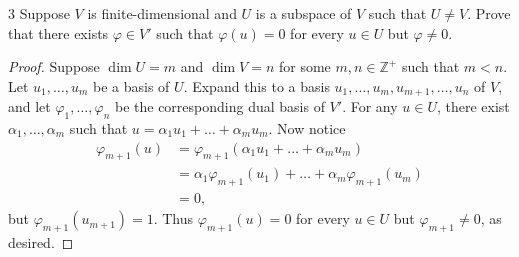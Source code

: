 \documentclass[11pt]{extarticle}
\newenvironment{problem}[1]{\begin{prob*}{#1}{}}{\end{prob*}}
\newcommand{\Z}{\mathbb{Z}}
\begin{document}
\begin{problem}{3}
Suppose $V$ is finite-dimensional and $U$ is a subspace of $V$ such that $U\neq V$.  Prove that there exists $\varphi\in V'$ such that $\varphi(u)=0$ for every $u\in U$ but $\varphi\neq 0$.
\end{problem}
\begin{proof}
Suppose $\dim U = m$ and $\dim V = n$ for some $m,n\in\Z^+$ such that $m < n$.  Let $u_1,\dots,u_m$ be a basis of $U$.  Expand this to a basis $u_1,\dots, u_m,u_{m+1},\dots,u_n$ of $V$, and let $\varphi_1,\dots,\varphi_n$ be the corresponding dual basis of $V'$.  For any $u\in U$, there exist $\alpha_1,\dots,\alpha_m$ such that $u=\alpha_1u_1+\dots+\alpha_mu_m$.  Now notice
\begin{align*}
\varphi_{m+1}(u) &= \varphi_{m+1}(\alpha_1u_1+\dots+\alpha_mu_m)\\
&= \alpha_1\varphi_{m+1}(u_1) + \dots + \alpha_m\varphi_{m+1}(u_m)\\
&= 0,
\end{align*}
but $\varphi_{m+1}(u_{m+1}) = 1$.  Thus $\varphi_{m+1}(u)=0$ for every $u\in U$ but $\varphi_{m+1}\neq 0$, as desired.
\end{proof}
\end{document}
